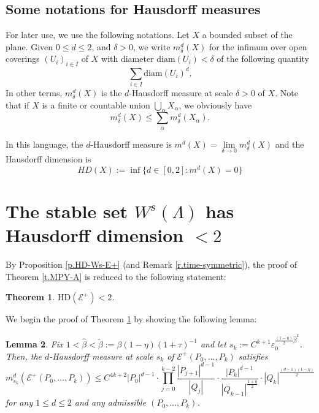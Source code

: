\documentclass[12pt]{amsart}
\newtheorem{theorem}{Theorem}[section]
\newtheorem{lemma}[theorem]{Lemma}
\numberwithin{equation}{section}
\theoremstyle{definition}
\newcommand{\<}{{\langle}}
\renewcommand{\>}{{\rangle}}
\begin{document}
\subsection{Some notations for Hausdorff measures} For later use, we use the following notations. Let $X$ a bounded subset of the plane. Given $0\leq d\leq 2$, and $\delta>0$, we write $m^d_{\delta}(X)$ for the infimum over open coverings $(U_i)_{i\in I}$ of $X$ with diameter $\textrm{diam}(U_i)<\delta$ of the following quantity
$$\sum\limits_{i\in I}\textrm{diam}(U_i)^d.$$
In other terms, $m_{\delta}^d(X)$ is the $d$-Hausdorff measure at scale $\delta>0$ of $X$. Note that if $X$ is a finite or countable union $\bigcup\limits_{\alpha}X_{\alpha}$, we obviously have 
$$m_{\delta}^d(X)\leq\sum\limits_{\alpha} m_{\delta}^d(X_{\alpha}).$$


In this language, the $d$-Hausdorff measure is $m^d(X)=\lim\limits_{\delta\to 0} m_{\delta}^d(X)$ and the Hausdorff dimension is 
$$HD(X):=\inf\{d\in[0, 2]: m^d(X)=0\}$$
\section{The stable set $W^s(\Lambda)$ has Hausdorff dimension $<2$}\label{s.MPY-A}

By Proposition \ref{p.HD-Ws-E+} (and Remark \ref{r.time-symmetric}), the proof of Theorem \ref{t.MPY-A} is reduced to the following statement:

\begin{theorem}\label{t.MPY-A-1} $\textrm{HD}(\mathcal{E}^+)<2$.
\end{theorem}

We begin the proof of Theorem \ref{t.MPY-A-1} by showing the following lemma:
\begin{lemma}\label{l.mdE+P0...Pk} Fix $1<\widehat{\beta}<\widetilde{\beta}:=\beta(1-\eta)(1+\tau)^{-1}$ and let $s_k:=C^{k+1}\varepsilon_0^{\frac{(1-\eta)}{2}\widehat{\beta}^k}$. Then, the $d$-Hausdorff measure at scale $s_k$ of 
$\mathcal{E}^+(P_0,\dots,P_k)$ satisfies 
$$m^d_{s_k}(\mathcal{E}^+(P_0,\dots, P_k))\leq C^{4k+2} |P_0|^{d-1}\cdot\prod\limits_{j=0}^{k-2}\frac{|P_{j+1}|^{d-1}}{|Q_j|}\cdot\frac{|P_k|^{d-1}}{|Q_{k-1}|^{\frac{1+\eta}{2}}}\cdot |Q_k|^{\frac{(d-1)(1-\eta)}{2}}$$
for any $1\leq d\leq 2$ and any admissible $(P_0,\dots,P_k)$. 
\end{lemma}
\end{document}
